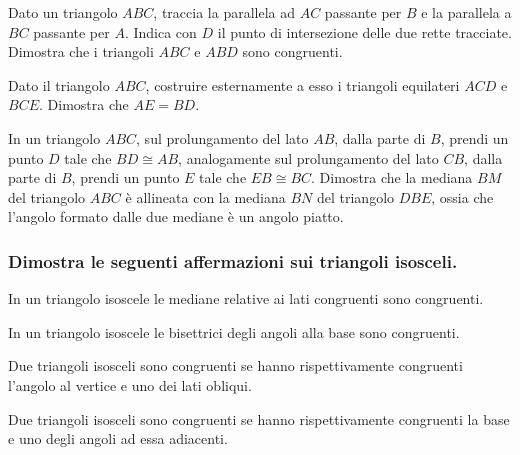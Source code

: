 \begin{multicols}{2}
\begin{esercizio}
\label{ese:2.25}
Dato un triangolo $ABC$, traccia la parallela ad $AC$ passante per 
$B$ e la parallela a $BC$ passante per $A$. Indica con $D$ il punto 
di intersezione delle due rette tracciate. Dimostra che i triangoli 
$ABC$ e $ABD$ sono congruenti.
\end{esercizio}

\begin{esercizio}
\label{ese:2.26}
Dato il triangolo $ABC$, costruire esternamente a esso i triangoli 
equilateri $ACD$ e $BCE$. Dimostra che $AE=BD$.
\end{esercizio}

\begin{esercizio}
\label{ese:2.27}
In un triangolo $ABC$, sul prolungamento del lato $AB$, dalla parte 
di $B$, prendi un punto $D$ tale che $BD\cong AB$, analogamente sul 
prolungamento del lato $CB$, dalla parte di $B$, prendi un punto $E$ 
tale che $EB\cong BC$. Dimostra che la mediana $BM$ del triangolo 
$ABC$ è allineata con la mediana $BN$ del triangolo $DBE$, ossia che 
l'angolo formato dalle due mediane è un angolo piatto.
\end{esercizio}

\subsubsection*{Dimostra le seguenti affermazioni sui triangoli 
isosceli.}

\begin{esercizio}
\label{ese:2.28}
In un triangolo isoscele le mediane relative ai lati congruenti sono 
congruenti. 
\end{esercizio}

\begin{esercizio}
\label{ese:2.29}
In un triangolo isoscele le bisettrici degli angoli alla base sono 
congruenti. 
\end{esercizio}

\begin{esercizio}
\label{ese:2.30}
Due triangoli isosceli sono congruenti se hanno rispettivamente 
congruenti l'angolo al vertice e uno dei lati obliqui.
\end{esercizio}

\begin{esercizio}
\label{ese:2.31}
Due triangoli isosceli sono congruenti se hanno rispettivamente 
congruenti la base e uno degli angoli ad essa adiacenti.
\end{esercizio}


\end{multicols}
